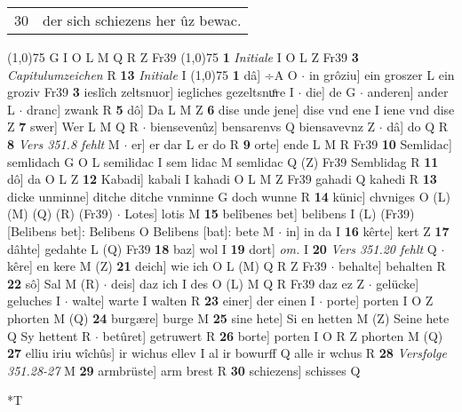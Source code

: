 \documentclass[8pt,a4paper,notitlepage]{article}
\begin{document}
\begin{table}[ht]
\begin{minipage}[t]{0.5\linewidth}
\begin{tabular}{rl}
30 & der sich schiezens her ûz bewac.\\ 
\end{tabular}
\scriptsize
\line(1,0){75} \newline
G I O L M Q R Z Fr39 \newline
\line(1,0){75} \newline
\textbf{1} \textit{Initiale} I O L Z Fr39  \textbf{3} \textit{Capitulumzeichen} R  \textbf{13} \textit{Initiale} I  \newline
\line(1,0){75} \newline
\textbf{1} dâ] ÷A O  $\cdot$ in grôziu] ein groszer L ein groziv Fr39 \textbf{3} ieslîch zeltsnuor] iegliches gezeltsnuͦre I  $\cdot$ die] de G  $\cdot$ anderen] ander L  $\cdot$ dranc] zwank R \textbf{5} dô] Da L M Z \textbf{6} dise unde jene] dise vnd ene I iene vnd dise Z \textbf{7} swer] Wer L M Q R  $\cdot$ biensevenûz] bensarenvs Q biensavevnz Z  $\cdot$ dâ] do Q R \textbf{8} \textit{Vers 351.8 fehlt} M   $\cdot$ er] er dar L er do R \textbf{9} orte] ende L M R Fr39 \textbf{10} Semlidac] semlidach G O L semilidac I sem lidac M semlidac Q (Z) Fr39 Semblidag R \textbf{11} dô] da O L Z \textbf{12} Kabadi] kabali I kahadi O L M Z Fr39 gahadi Q kahedi R \textbf{13} dicke unminne] ditche ditche vnminne G doch wunne R \textbf{14} künic] chvniges O (L) (M) (Q) (R) (Fr39)  $\cdot$ Lotes] lotis M \textbf{15} belîbenes bet] belibens I (L) (Fr39) [Belibens bet]: Belibens  O Belibens [bat]: bete M  $\cdot$ in] in da I \textbf{16} kêrte] kert Z \textbf{17} dâhte] gedahte L (Q) Fr39 \textbf{18} baz] wol I \textbf{19} dort] \textit{om.} I \textbf{20} \textit{Vers 351.20 fehlt} Q   $\cdot$ kêre] en kere M (Z) \textbf{21} deich] wie ich O L (M) Q R Z Fr39  $\cdot$ behalte] behalten R \textbf{22} sô] Sal M (R)  $\cdot$ deis] daz ich I des O (L) M Q R Fr39 daz ez Z  $\cdot$ gelücke] geluches I  $\cdot$ walte] warte I walten R \textbf{23} einer] der einen I  $\cdot$ porte] porten I O Z phorten M (Q) \textbf{24} burgære] burge M \textbf{25} sine hete] Si en hetten M (Z) Seine hete Q Sy hettent R  $\cdot$ betûret] getruwert R \textbf{26} borte] porten I O R Z phorten M (Q) \textbf{27} elliu iriu wîchûs] ir wichus ellev I al ir bowurff Q alle ir wchus R \textbf{28} \textit{Versfolge 351.28-27} M  \textbf{29} armbrüste] arm brest R \textbf{30} schiezens] schisses Q \newline
\end{minipage}
\hspace{0.5cm}
\begin{minipage}[t]{0.5\linewidth}
\small
\begin{center}*T

\end{center}
\end{minipage}
\end{table}
\end{document}
